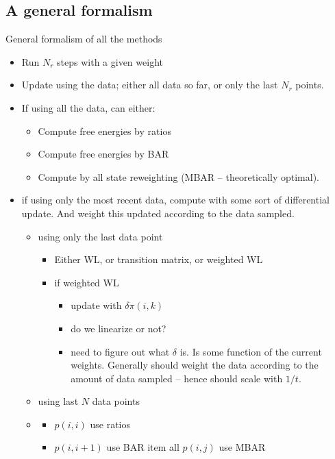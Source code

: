 \documentclass[superscriptaddress,showkeys, nofootinbib, pre, aps]{revtex4-1}
\begin{document}
\subsection{\label{sec:general}A general formalism}

General formalism of all the methods 

\begin{itemize}
\item Run $N_r$ steps with a given weight

\item Update using the data; either all data so far, or only the last $N_r$ points.

\item If using all the data, can either:
\begin{itemize}
  \item Compute free energies by ratios
  \item Compute free energies by BAR
  \item Compute by all state reweighting (MBAR -- theoretically optimal).
\end{itemize}

\item if using only the most recent data, compute with some sort of differential update.  And weight this updated according to the data sampled.
\begin{itemize}
  \item using only the last data point
  \begin{itemize} 
  \item Either WL, or transition matrix, or weighted WL
  \item if weighted WL \begin{itemize}
  \item update with $\delta \pi(i,k)$
   \item do we linearize or not?

  \item need to figure out what $\delta$ is. Is some function of the current weights. Generally should weight the data according to the amount of data sampled -- hence should scale with $1/t$.
  \end{itemize}
  \end{itemize}
  \item using last $N$ data points
   \item \begin{itemize}
    \item $p(i,i)$ use ratios
    \item $p(i,i+1)$ use BAR
    item all $p(i,j)$ use MBAR
   \end{itemize}


\end{itemize}
\end{itemize}
\end{document}
